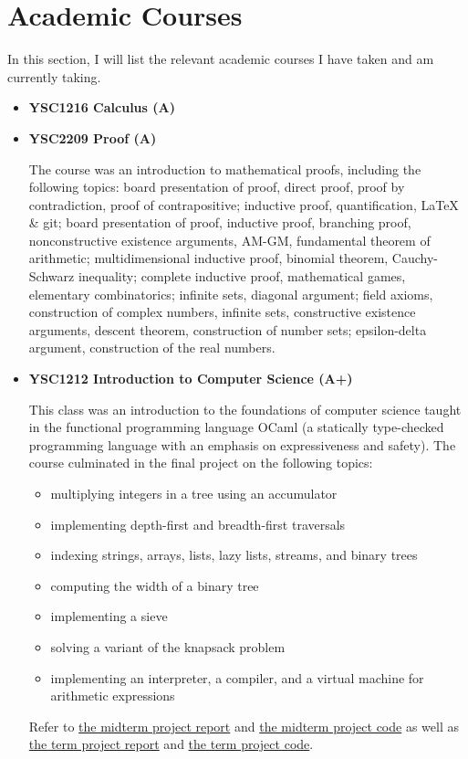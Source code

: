 \documentclass[11pt,reqno,oneside,a4paper]{article}
\begin{document}
	\section{Academic Courses}
	
	In this section, I will list the relevant academic courses I have taken and am currently taking.
	
	\begin{itemize}
		\item \textbf{YSC1216 Calculus (A)}
		
		\item \textbf{YSC2209 Proof (A)}
	
		\par The course was an introduction to mathematical proofs, including the following topics: board presentation of proof, direct proof, proof by contradiction, proof of contrapositive; inductive proof, quantification, LaTeX \& git; board presentation of proof, inductive proof, branching proof, nonconstructive existence arguments, AM-GM, fundamental theorem of arithmetic; multidimensional inductive proof, binomial theorem, Cauchy-Schwarz inequality; complete inductive proof, mathematical games, elementary combinatorics; infinite sets, diagonal argument; field axioms, construction of complex numbers, infinite sets, constructive existence arguments, descent theorem, construction of number sets; epsilon-delta argument, construction of the real numbers.
		
		\item \textbf{YSC1212 Introduction to Computer Science (A+)}
		
		\par This class was an introduction to the foundations of computer science taught in the functional programming language OCaml (a statically type-checked programming language with an emphasis on expressiveness and safety). The course culminated in the final project on the following topics:
		\begin{itemize}
			\item multiplying integers in a tree using an accumulator
			\item implementing depth-first and breadth-first traversals
			\item indexing strings, arrays, lists, lazy lists, streams, and binary trees
			\item computing the width of a binary tree
			\item implementing a sieve
			\item solving a variant of the knapsack problem
			\item implementing an interpreter, a compiler, and a virtual machine for arithmetic expressions
		\end{itemize}
		Refer to \href{https://github.com/zhangliu6/course-submissions/blob/main/Intro_to_CS_Midterm%20(7).pdf}{the midterm project report} and \href{https://github.com/zhangliu6/course-submissions/blob/main/midterm-codes.zip}{the midterm project code} as well as \href{https://github.com/zhangliu6/course-submissions/blob/main/Term%20Project.pdf}{the term project report} and \href{https://github.com/zhangliu6/course-submissions/blob/main/final-codes.zip}{the term project code}.
		

\end{itemize}
\end{document}
